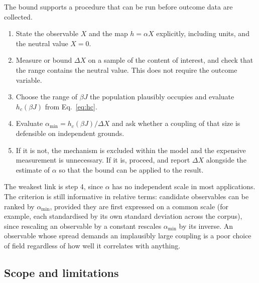 \documentclass[preprint,12pt]{elsarticle}
\begin{document}
The bound supports a procedure that can be run before outcome data are collected.

\begin{enumerate}
\item State the observable $X$ and the map $h = \alpha X$ explicitly, including units, and
the neutral value $X = 0$.
\item Measure or bound $\Delta X$ on a sample of the content of interest, and check that the
range contains the neutral value. This does not require the outcome variable.
\item Choose the range of $\beta J$ the population plausibly occupies and evaluate
$h_c(\beta J)$ from Eq.~\eqref{eq:hc}.
\item Evaluate $\alpha_{\min} = h_c(\beta J)/\Delta X$ and ask whether a coupling of that
size is defensible on independent grounds.
\item If it is not, the mechanism is excluded within the model and the expensive measurement
is unnecessary. If it is, proceed, and report $\Delta X$ alongside the estimate of $\alpha$
so that the bound can be applied to the result.
\end{enumerate}

The weakest link is step 4, since $\alpha$ has no independent scale in most applications. The
criterion is still informative in relative terms: candidate observables can be ranked by
$\alpha_{\min}$, provided they are first expressed on a common scale (for example, each
standardised by its own standard deviation across the corpus), since rescaling an observable
by a constant rescales $\alpha_{\min}$ by its inverse. An observable whose spread demands an
implausibly large coupling is a poor choice of field regardless of how well it correlates with
anything.

\subsection{Scope and limitations}
\label{sec:limitations}
\end{document}
